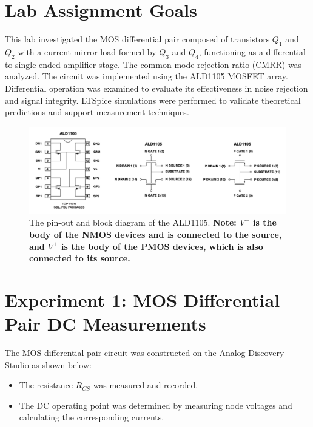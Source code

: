 
	
\section{Lab Assignment Goals}

\justifying 
\par
This lab investigated the MOS differential pair composed of transistors $Q_1$ and $Q_2$ with a current mirror load formed by $Q_3$ and $Q_4$, functioning as a differential to single-ended amplifier stage. The common-mode rejection ratio (CMRR) was analyzed. The circuit was implemented using the ALD1105 MOSFET array. Differential operation was examined to evaluate its effectiveness in noise rejection and signal integrity. LTSpice simulations were performed to validate theoretical predictions and support measurement techniques.

\begin{center}
\begin{figure}[h]
\includegraphics[scale=0.5]{Chapter_7/Lab_07_Image_1.png}
\caption{The pin-out and block diagram of the ALD1105. \textbf{Note: $V^{-}$ is the body of the NMOS devices and is connected to the source, and $V^{+}$ is the body of the PMOS devices, which is also connected to its source.}}
\label{Ch7_fig:1}
\end{figure}
\end{center}

\section{Experiment 1: MOS Differential Pair DC Measurements}

The MOS differential pair circuit was constructed on the Analog Discovery Studio as shown below:

\begin{itemize}
    \item The resistance $R_{CS}$ was measured and recorded.
    \item The DC operating point was determined by measuring node voltages and calculating the corresponding currents.
\end{itemize}

